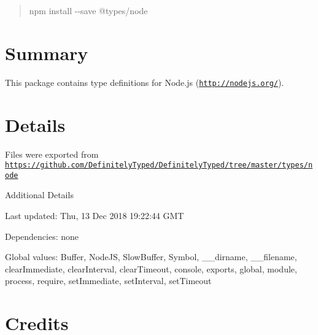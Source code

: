 \begin{quote}
{\ttfamily npm install -\/-\/save @types/node} \end{quote}


\section*{Summary}

This package contains type definitions for Node.\+js (\href{http://nodejs.org/}{\tt http\+://nodejs.\+org/}).

\section*{Details}

Files were exported from \href{https://github.com/DefinitelyTyped/DefinitelyTyped/tree/master/types/node}{\tt https\+://github.\+com/\+Definitely\+Typed/\+Definitely\+Typed/tree/master/types/node}

Additional Details
\begin{DoxyItemize}
\item Last updated\+: Thu, 13 Dec 2018 19\+:22\+:44 G\+MT
\item Dependencies\+: none
\item Global values\+: Buffer, Node\+JS, Slow\+Buffer, Symbol, \+\_\+\+\_\+dirname, \+\_\+\+\_\+filename, clear\+Immediate, clear\+Interval, clear\+Timeout, console, exports, global, module, process, require, set\+Immediate, set\+Interval, set\+Timeout
\end{DoxyItemize}

\section*{Credits}

